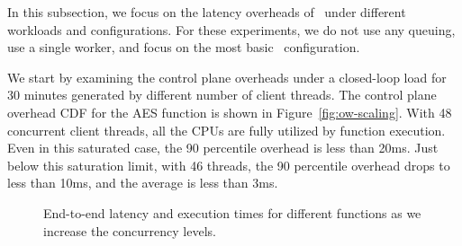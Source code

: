 
In this subsection, we focus on the latency overheads of \sysname~under different workloads and configurations.
For these experiments, we do not use any queuing, use a single worker, and focus on the most basic \sysname~configuration.  

We start by examining the control plane overheads under a closed-loop load for 30 minutes generated by different number of client threads. 
The control plane overhead CDF for the AES function is shown in Figure~\ref{fig:ow-scaling}. %
With 48 concurrent client threads, all the CPUs are fully utilized by function execution. 
Even in this saturated case, the 90 percentile overhead is less than 20ms. 
Just below this saturation limit, with 46 threads, the 90 percentile overhead drops to less than 10ms, and the average is less than 3ms. 


\begin{figure}
  \centering
      \caption{End-to-end latency and execution times for different functions as we increase the concurrency levels.}
  \label{fig:flow-fn-all}
\end{figure}

